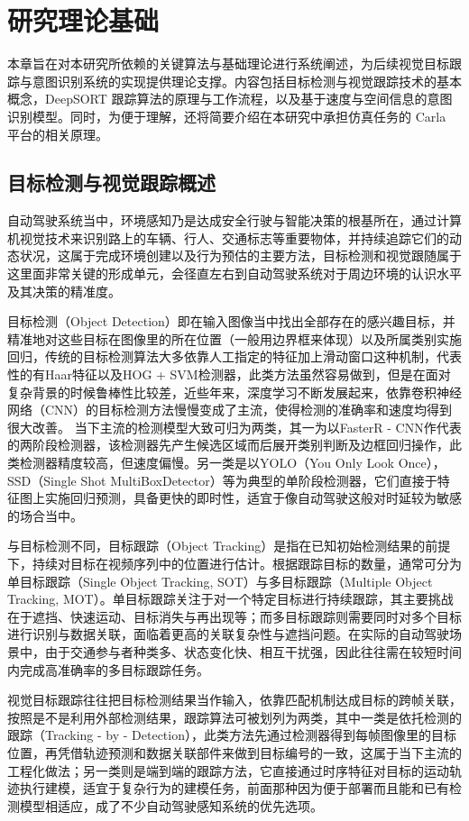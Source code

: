 \chapter{研究理论基础}

本章旨在对本研究所依赖的关键算法与基础理论进行系统阐述，为后续视觉目标跟踪与意图识别系统的实现提供理论支撑。内容包括目标检测与视觉跟踪技术的基本概念，DeepSORT 跟踪算法的原理与工作流程，以及基于速度与空间信息的意图识别模型。同时，为便于理解，还将简要介绍在本研究中承担仿真任务的 Carla 平台的相关原理。

\section{目标检测与视觉跟踪概述}

自动驾驶系统当中，环境感知乃是达成安全行驶与智能决策的根基所在，通过计算机视觉技术来识别路上的车辆、行人、交通标志等重要物体，并持续追踪它们的动态状况，这属于完成环境创建以及行为预估的主要方法，目标检测和视觉跟随属于这里面非常关键的形成单元，会径直左右到自动驾驶系统对于周边环境的认识水平及其决策的精准度。

目标检测（Object Detection）即在输入图像当中找出全部存在的感兴趣目标，并精准地对这些目标在图像里的所在位置（一般用边界框来体现）以及所属类别实施回归，传统的目标检测算法大多依靠人工指定的特征加上滑动窗口这种机制，代表性的有Haar特征以及HOG + SVM检测器，此类方法虽然容易做到，但是在面对复杂背景的时候鲁棒性比较差，近些年来，深度学习不断发展起来，依靠卷积神经网络（CNN）的目标检测方法慢慢变成了主流，使得检测的准确率和速度均得到很大改善。 当下主流的检测模型大致可归为两类，其一为以FasterR - CNN作代表的两阶段检测器，该检测器先产生候选区域而后展开类别判断及边框回归操作，此类检测器精度较高，但速度偏慢。另一类是以YOLO（You Only Look Once），SSD（Single Shot MultiBoxDetector）等为典型的单阶段检测器，它们直接于特征图上实施回归预测，具备更快的即时性，适宜于像自动驾驶这般对时延较为敏感的场合当中。

与目标检测不同，目标跟踪（Object Tracking）是指在已知初始检测结果的前提下，持续对目标在视频序列中的位置进行估计。根据跟踪目标的数量，通常可分为单目标跟踪（Single Object Tracking, SOT）与多目标跟踪（Multiple Object Tracking, MOT）。单目标跟踪关注于对一个特定目标进行持续跟踪，其主要挑战在于遮挡、快速运动、目标消失与再出现等；而多目标跟踪则需要同时对多个目标进行识别与数据关联，面临着更高的关联复杂性与遮挡问题。在实际的自动驾驶场景中，由于交通参与者种类多、状态变化快、相互干扰强，因此往往需在较短时间内完成高准确率的多目标跟踪任务。

视觉目标跟踪往往把目标检测结果当作输入，依靠匹配机制达成目标的跨帧关联，按照是不是利用外部检测结果，跟踪算法可被划列为两类，其中一类是依托检测的跟踪（Tracking - by - Detection），此类方法先通过检测器得到每帧图像里的目标位置，再凭借轨迹预测和数据关联部件来做到目标编号的一致，这属于当下主流的工程化做法；另一类则是端到端的跟踪方法，它直接通过时序特征对目标的运动轨迹执行建模，适宜于复杂行为的建模任务，前面那种因为便于部署而且能和已有检测模型相适应，成了不少自动驾驶感知系统的优先选项。

